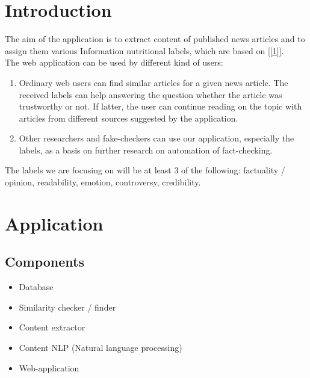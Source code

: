 \documentclass[10pt]{article}
\begin{document}
\begin{multicols}{2}


\section{Introduction}
The aim of the application is to extract content of published news articles and to assign them various \grqq{} Information nutritional labels\grqq{}, which are based on \ref{[1]}.\\
The web application can be used by different kind of users:
\begin{enumerate}
\item Ordinary web users can find similar articles for a given news article. The received labels can help answering the question whether the article was trustworthy or not. If latter, the user can continue reading on the topic with articles from different sources suggested by the application.
\item Other researchers and fake-checkers can use our application, especially the labels, as a basis on further research on automation of fact-checking.
\end{enumerate}
The labels we are focusing on will be at least 3 of the following: factuality / opinion, readability, emotion, controversy, credibility.


\section{Application}
\subsection{Components}
\begin{itemize}
\item Database
\item Similarity checker / finder
\item Content extractor
\item Content NLP (Natural language processing)
\item Web-application
\end{itemize}

\end{multicols}
\end{document}
